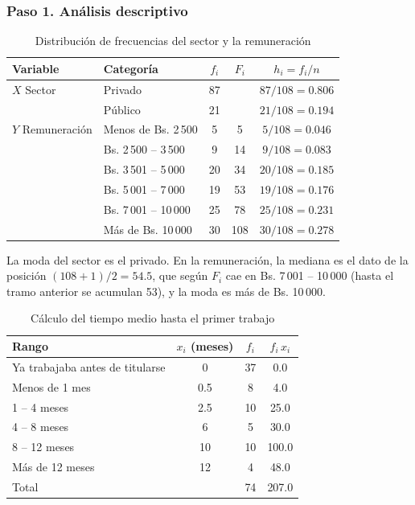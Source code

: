 \documentclass[12pt, a4paper]{article}
\newenvironment{mitabla}[2][H]{%
  \begin{table}[#1]
  \centering
  \caption{#2}
  \small
}{%
  \end{table}
}
\begin{document}
\subsubsection{Paso 1. Análisis descriptivo}

\begin{mitabla}{Distribución de frecuencias del sector y la remuneración}\label{tab:a3-frec}
\begin{tabular}{llccc}
\toprule
\textbf{Variable} & \textbf{Categoría} & \textbf{$f_i$} & \textbf{$F_i$} & \textbf{$h_i = f_i/n$} \\
\midrule
$X$ Sector & Privado & 87 & & $87/108 = 0.806$ \\
 & Público & 21 & & $21/108 = 0.194$ \\
\midrule
$Y$ Remuneración & Menos de Bs. 2\,500 & 5 & 5 & $5/108 = 0.046$ \\
 & Bs. 2\,500 -- 3\,500 & 9 & 14 & $9/108 = 0.083$ \\
 & Bs. 3\,501 -- 5\,000 & 20 & 34 & $20/108 = 0.185$ \\
 & Bs. 5\,001 -- 7\,000 & 19 & 53 & $19/108 = 0.176$ \\
 & Bs. 7\,001 -- 10\,000 & 25 & 78 & $25/108 = 0.231$ \\
 & Más de Bs. 10\,000 & 30 & 108 & $30/108 = 0.278$ \\
\bottomrule
\end{tabular}
\end{mitabla}

La moda del sector es el privado. En la remuneración, la mediana es el
dato de la posición $(108+1)/2 = 54.5$, que según $F_i$ cae en Bs.
7\,001 -- 10\,000 (hasta el tramo anterior se acumulan 53), y la moda es
más de Bs. 10\,000.

\begin{mitabla}{Cálculo del tiempo medio hasta el primer trabajo}\label{tab:a3-tiempo}
\begin{tabular}{lccc}
\toprule
\textbf{Rango} & \textbf{$x_i$ (meses)} & \textbf{$f_i$} & \textbf{$f_i \, x_i$} \\
\midrule
Ya trabajaba antes de titularse & 0 & 37 & 0.0 \\
Menos de 1 mes & 0.5 & 8 & 4.0 \\
1 -- 4 meses & 2.5 & 10 & 25.0 \\
4 -- 8 meses & 6 & 5 & 30.0 \\
8 -- 12 meses & 10 & 10 & 100.0 \\
Más de 12 meses & 12 & 4 & 48.0 \\
\midrule
Total & & 74 & 207.0 \\
\bottomrule
\end{tabular}
\end{mitabla}
\end{document}

